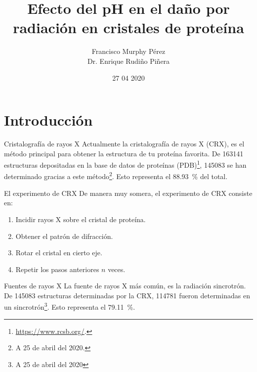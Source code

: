\documentclass{beamer}
\title{Efecto del pH en el daño por radiación en cristales de proteína}
\author{Francisco Murphy Pérez \\ Dr. Enrique Rudiño Piñera}
\institute{Instituto de Biotecnología \\ Universidad Nacional Autónoma de México}
\date{27 04 2020}
\begin{document}
\begin{frame}
	\maketitle %
\end{frame}
\section{Introducción}
\begin{frame}{Cristalografía de rayos X}
Actualmente la cristalografía de rayos X (CRX), es el método principal para obtener la estructura de tu proteína favorita. De 163141 estructuras depositadas en la base de datos de proteínas (PDB)\footnote{\url{https://www.rcsb.org/}.}, 145083 se han determinado gracias a este método\footnote{A 25 de abril del 2020.}. Esto representa el \SI{88.93}{\percent} del total.
\end{frame}
\begin{frame}{El experimento de CRX}
De manera muy somera, el experimento de CRX consiste en:
\begin{enumerate}
  \item Incidir \alert{rayos X} sobre el cristal de proteína. 
  \item Obtener el patrón de difracción. 
  \item Rotar el cristal en cierto eje. 
  \item Repetir los pasos anteriores $n$ veces.
\end{enumerate}
\end{frame}
\begin{frame}{Fuentes de rayos X}
 La fuente de rayos X más común, es la radiación sincrotrón. De 145083 estructuras determinadas por la CRX, 114781 fueron determinadas en un sincrotrón\footnote{A 25 de abril del 2020}. Esto representa el \SI{79.11}{\percent}.
\end{frame}
\end{document}
